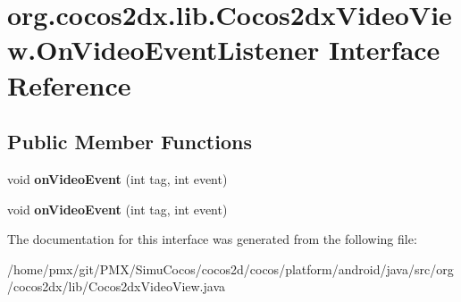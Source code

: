 \hypertarget{interfaceorg_1_1cocos2dx_1_1lib_1_1Cocos2dxVideoView_1_1OnVideoEventListener}{}\section{org.\+cocos2dx.\+lib.\+Cocos2dx\+Video\+View.\+On\+Video\+Event\+Listener Interface Reference}
\label{interfaceorg_1_1cocos2dx_1_1lib_1_1Cocos2dxVideoView_1_1OnVideoEventListener}
\subsection*{Public Member Functions}
\begin{DoxyCompactItemize}
\item 
\mbox{\label{interfaceorg_1_1cocos2dx_1_1lib_1_1Cocos2dxVideoView_1_1OnVideoEventListener_a735f30c6ca3f7278a6d9936b93c5ce5c}} 
void {\bfseries on\+Video\+Event} (int tag, int event)
\item 
\mbox{\label{interfaceorg_1_1cocos2dx_1_1lib_1_1Cocos2dxVideoView_1_1OnVideoEventListener_a735f30c6ca3f7278a6d9936b93c5ce5c}} 
void {\bfseries on\+Video\+Event} (int tag, int event)
\end{DoxyCompactItemize}


The documentation for this interface was generated from the following file\+:\begin{DoxyCompactItemize}
\item 
/home/pmx/git/\+P\+M\+X/\+Simu\+Cocos/cocos2d/cocos/platform/android/java/src/org/cocos2dx/lib/Cocos2dx\+Video\+View.\+java\end{DoxyCompactItemize}
